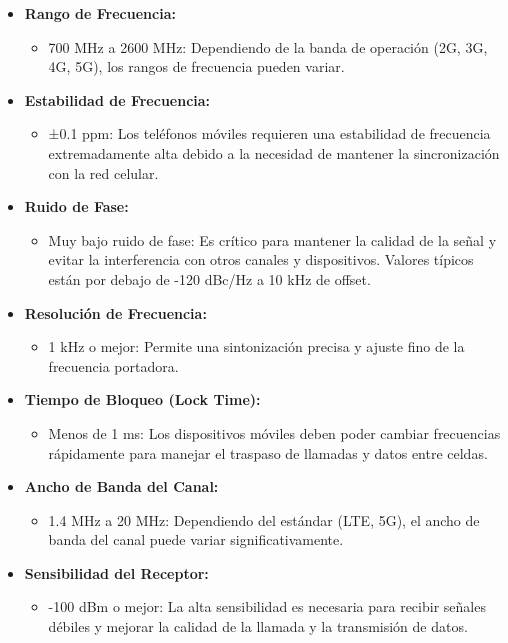 \begin{itemize}
    \item \textbf{Rango de Frecuencia:} 
    \begin{itemize}
        \item 700 MHz a 2600 MHz: Dependiendo de la banda de operación (2G, 3G, 4G, 5G), los rangos de frecuencia pueden variar.
    \end{itemize}
    \item \textbf{Estabilidad de Frecuencia:} 
    \begin{itemize}
        \item ±0.1 ppm: Los teléfonos móviles requieren una estabilidad de frecuencia extremadamente alta debido a la necesidad de mantener la sincronización con la red celular.
    \end{itemize}
    \item \textbf{Ruido de Fase:} 
    \begin{itemize}
        \item Muy bajo ruido de fase: Es crítico para mantener la calidad de la señal y evitar la interferencia con otros canales y dispositivos. Valores típicos están por debajo de -120 dBc/Hz a 10 kHz de offset.
    \end{itemize}
    \item \textbf{Resolución de Frecuencia:} 
    \begin{itemize}
        \item 1 kHz o mejor: Permite una sintonización precisa y ajuste fino de la frecuencia portadora.
    \end{itemize}
    \item \textbf{Tiempo de Bloqueo (Lock Time):} 
    \begin{itemize}
        \item Menos de 1 ms: Los dispositivos móviles deben poder cambiar frecuencias rápidamente para manejar el traspaso de llamadas y datos entre celdas.
    \end{itemize}
    \item \textbf{Ancho de Banda del Canal:} 
    \begin{itemize}
        \item 1.4 MHz a 20 MHz: Dependiendo del estándar (LTE, 5G), el ancho de banda del canal puede variar significativamente.
    \end{itemize}
    \item \textbf{Sensibilidad del Receptor:} 
    \begin{itemize}
        \item -100 dBm o mejor: La alta sensibilidad es necesaria para recibir señales débiles y mejorar la calidad de la llamada y la transmisión de datos.
    \end{itemize}
\end{itemize}


